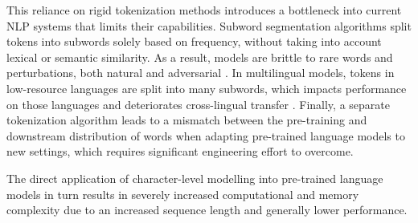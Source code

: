 \documentclass{article} \usepackage{iclr2022_conference,times}
\begin{document}
This reliance on rigid tokenization methods introduces a bottleneck into current NLP systems that limits their capabilities. Subword segmentation algorithms split tokens into subwords solely based on frequency, without taking into account lexical or semantic similarity. As a result, models are brittle to rare words \citep{Gong2018frage} and perturbations, both natural and adversarial \citep{Belinkov2018,pruthi-etal-2019-combating,sun2020adv}. In multilingual models, tokens in low-resource languages are split into many subwords, which impacts performance on those languages and deteriorates cross-lingual transfer \citep{Hu2020xtreme,Wang2021multi-view}. Finally, a separate tokenization algorithm leads to a mismatch between the pre-training and downstream distribution of words when adapting pre-trained language models to new settings, which requires significant engineering effort to overcome.

The direct application of character-level modelling into pre-trained language models in turn results in severely increased computational and memory complexity due to an increased sequence length and generally lower performance. 
\end{document}
